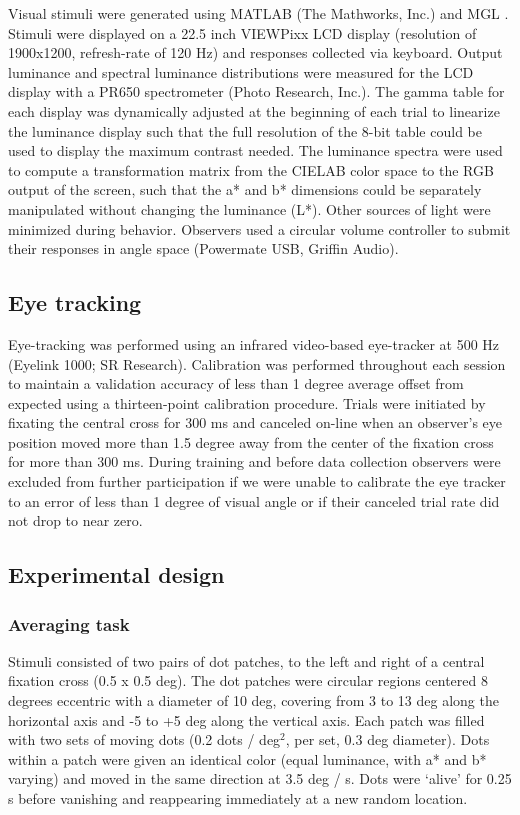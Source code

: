 Visual stimuli were generated using MATLAB (The Mathworks, Inc.) and MGL \citep{Gardner2018-uq}. Stimuli were displayed on a 22.5 inch VIEWPixx LCD display (resolution of 1900x1200, refresh-rate of 120 Hz) and responses collected via keyboard. Output luminance and spectral luminance distributions were measured for the LCD display with a PR650 spectrometer (Photo Research, Inc.). The gamma table for each display was dynamically adjusted at the beginning of each trial to linearize the luminance display such that the full resolution of the 8-bit table could be used to display the maximum contrast needed. The luminance spectra were used to compute a transformation matrix from the CIELAB color space to the RGB output of the screen, such that the a* and b* dimensions could be separately manipulated without changing the luminance (L*). Other sources of light were minimized during behavior. Observers used a circular volume controller to submit their responses in angle space (Powermate USB, Griffin Audio).

\subsection{Eye tracking}

Eye-tracking was performed using an infrared video-based eye-tracker at 500 Hz (Eyelink 1000; SR Research). Calibration was performed throughout each session to maintain a validation accuracy of less than 1 degree average offset from expected using a thirteen-point calibration procedure. Trials were initiated by fixating the central cross for 300 ms and canceled on-line when an observer’s eye position moved more than 1.5 degree away from the center of the fixation cross for more than 300 ms. During training and before data collection observers were excluded from further participation if we were unable to calibrate the eye tracker to an error of less than 1 degree of visual angle or if their canceled trial rate did not drop to near zero.

\subsection{Experimental design}

\subsubsection{Averaging task}

Stimuli consisted of two pairs of dot patches, to the left and right of a central fixation cross (0.5 x 0.5 deg). The dot patches were circular regions centered 8 degrees eccentric with a diameter of 10 deg, covering from 3 to 13 deg along the horizontal axis and -5 to +5 deg along the vertical axis. Each patch was filled with two sets of moving dots (0.2 dots / deg$^2$, per set, 0.3 deg diameter). Dots within a patch were given an identical color (equal luminance, with a* and b* varying) and moved in the same direction at 3.5 deg / s. Dots were `alive' for 0.25 s before vanishing and reappearing immediately at a new random location.


